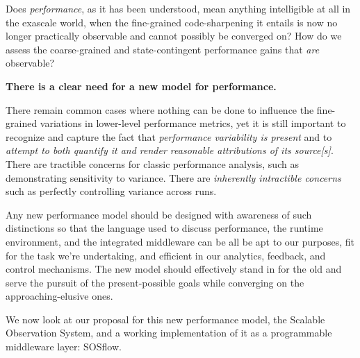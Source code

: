 Does \textit{performance}, as it has been understood, mean anything
intelligible at all in the exascale world, when the fine-grained
code-sharpening it entails is now no longer practically observable and
cannot possibly be converged on?
%
How do we assess the coarse-grained and state-contingent performance
gains that \textit{are} observable?

\textbf{There is a clear need for a new model for performance.}

There remain common cases where nothing can be done to influence the
fine-grained variations in lower-level performance metrics, yet it is
still important to recognize and capture the fact that
\textit{performance variability is present} and to \textit{attempt to
  both quantify it and render reasonable attributions of its
  source[s]}.
%
There are tractible concerns for classic performance
analysis, such as demonstrating sensitivity to variance.
%
There are \textit{inherently intractible concerns} such as perfectly
controlling variance across runs.

Any new performance model should be designed with awareness of such
distinctions so that the language used to discuss performance, the
runtime environment, and the integrated middleware can be all be apt
to our purposes, fit for the task we're undertaking, and efficient in
our analytics, feedback, and control mechanisms.
%
The new model should effectively stand in for the old and serve the
pursuit of the present-possible goals while converging on the
approaching-elusive ones.

We now look at our proposal for this new performance model, the
Scalable Observation System, and a working implementation of it
as a programmable middleware layer: SOSflow.


